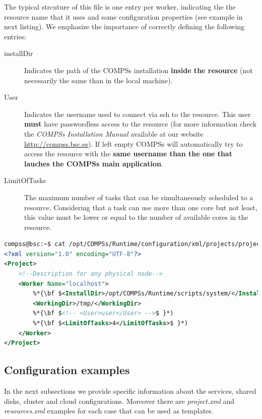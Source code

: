 The typical strcuture of this file is one entry per worker, indicating the the resource name that it uses and some configuration
properties (see example in next listing). We emphasize the importance of correctly defining the following 
entries:
\begin{description}
 \item [installDir] Indicates the path of the COMPSs installation \textbf{inside the resource} (not necessarily the same 
 than in the local machine).
 \item [User] Indicates the username used to connect via ssh to the resource. This user \textbf{must} have passwordless access to the
 resource (for more information check the \textit{COMPSs Installation Manual} available at our website \url{http://compss.bsc.es}).
 If left empty COMPSs will automatically try to access the resource with the \textbf{same username than the one that lauches 
 the COMPSs main application}.
 \item [LimitOfTasks] The maximum number of tasks that can be simultaneously scheduled to a resource. Considering that a task 
 can use more than one core but not least, this value must be lower or equal to the number of available cores in the resource. 
\end{description}


\begin{lstlisting}[language=xml]
compss@bsc:~$ cat /opt/COMPSs/Runtime/configuration/xml/projects/project.xml
<?xml version="1.0" encoding="UTF-8"?>
<Project>
	<!--Description for any physical node-->
	<Worker Name="localhost">
		%*{\bf $<InstallDir>/opt/COMPSs/Runtime/scripts/system/</InstallDir>$ }*)
		<WorkingDir>/tmp/</WorkingDir>
		%*{\bf $<!-- <User>user</User> -->$ }*)
		%*{\bf $<LimitOfTasks>4</LimitOfTasks>$ }*)
	</Worker>
</Project>
\end{lstlisting}
\label{lstlisting:project.xml}


\subsection{Configuration examples}
In the next subsections we provide specific information about the services, shared disks, cluster and cloud configurations. 
Moreover there are \textit{project.xml} and \textit{resources.xml} examples for each case that can be used as templates. 


